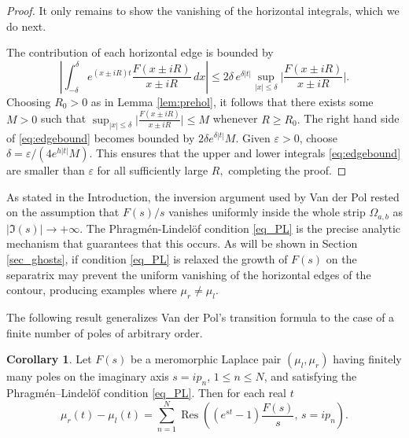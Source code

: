 \documentclass[12pt]{article}
\theoremstyle{definition}
\newtheorem{corollary}[theorem]{Corollary}
\DeclareMathOperator*{\Res}{Res}
\begin{document}
\begin{proof}
It only remains to show the vanishing of the horizontal integrals, which we do next.


The contribution of each horizontal edge is bounded by
\begin{equation}\label{eq:edgebound}
\left|\int_{-\delta}^{\delta} e^{(x\pm iR)t}\frac{F(x\pm iR)}{x\pm iR}\,dx\right|
\le 2\delta\, e^{\delta|t|} \sup_{ |x| \leq \delta} \Bigg | \frac{F(x \pm iR)}{x \pm iR} \Bigg |.
\end{equation}
Choosing $R_0>0$ as in Lemma \ref{lem:prehol}, it follows that there exists some $M>0$ such that $\displaystyle{\sup_{ |x| \leq \delta} \Bigg | \frac{F(x \pm iR)}{x \pm iR} \Bigg | \leq M}$ whenever $R \geq R_0.$ The right hand side of \eqref{eq:edgebound} becomes bounded by $2 \delta e^{\delta |t|}M.$
Given \( \varepsilon>0 \), choose
\( \delta=\varepsilon/(4e^{h|t|}M) \).
This ensures that the upper and lower integrals \eqref{eq:edgebound} are smaller than \( \varepsilon \) for all sufficiently large $R,$ completing the proof.
\end{proof}



As stated in the Introduction, the inversion argument used by Van der Pol \cite{VanderPol} rested on the assumption that \(F(s)/s\) vanishes uniformly inside the whole strip \(\Omega_{a,b}\) as \( |\Im(s)| \to + \infty.\) The Phragmén-Lindelöf condition \eqref{eq_PL} is the precise analytic mechanism that guarantees that this occurs. As will be shown in Section \ref{sec_ghosts}, if condition \eqref{eq_PL} is relaxed the growth of $F(s)$ on the separatrix may prevent the uniform vanishing of the horizontal edges of the contour, producing examples where $\mu_r \neq \mu_l.$ 

The 
following result generalizes Van der Pol's transition formula to the case of a finite number of poles of arbitrary order.


\begin{corollary}\label{cor:finitepoles}
Let \( F(s) \) be a meromorphic Laplace pair \( (\mu_l,\mu_r) \) having finitely many poles  on the imaginary axis 
\( s=ip_n \), \( 1\le n\le N \), and satisfying the Phragmén--Lindelöf condition \eqref{eq_PL}. Then for each real \( t \)
\begin{equation}
    \label{eq:finite_transition_formula}
\mu_r(t)-\mu_l(t) 
=
\sum_{n=1}^{N}
\Res\!\left((e^{st}-1)\frac{F(s)}{s},\, s=ip_n\right).
\end{equation}

\end{corollary}
\end{document}
